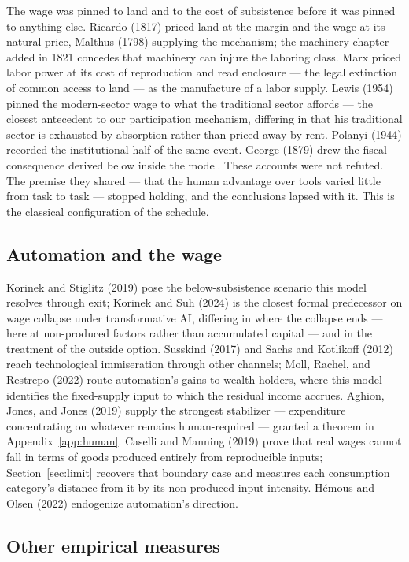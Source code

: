\documentclass[12pt]{article}
\theoremstyle{plain}
\begin{document}
The wage was pinned to land and to the cost of subsistence before it was pinned to anything else. Ricardo (1817) priced land at the margin and the wage at its natural price, Malthus (1798) supplying the mechanism; the machinery chapter added in 1821 concedes that machinery can injure the laboring class. Marx priced labor power at its cost of reproduction and read enclosure --- the legal extinction of common access to land --- as the manufacture of a labor supply. Lewis (1954) pinned the modern-sector wage to what the traditional sector affords --- the closest antecedent to our participation mechanism, differing in that his traditional sector is exhausted by absorption rather than priced away by rent. Polanyi (1944) recorded the institutional half of the same event. George (1879) drew the fiscal consequence derived below inside the model. These accounts were not refuted. The premise they shared --- that the human advantage over tools varied little from task to task --- stopped holding, and the conclusions lapsed with it. This is the classical configuration of the schedule.

\subsection{Automation and the wage}\label{sec:automation}

Korinek and Stiglitz (2019) pose the below-subsistence scenario this model resolves through exit; Korinek and Suh (2024) is the closest formal predecessor on wage collapse under transformative AI, differing in where the collapse ends --- here at non-produced factors rather than accumulated capital --- and in the treatment of the outside option. Susskind (2017) and Sachs and Kotlikoff (2012) reach technological immiseration through other channels; Moll, Rachel, and Restrepo (2022) route automation's gains to wealth-holders, where this model identifies the fixed-supply input to which the residual income accrues. Aghion, Jones, and Jones (2019) supply the strongest stabilizer --- expenditure concentrating on whatever remains human-required --- granted a theorem in Appendix~\ref{app:human}. Caselli and Manning (2019) prove that real wages cannot fall in terms of goods produced entirely from reproducible inputs; Section~\ref{sec:limit} recovers that boundary case and measures each consumption category's distance from it by its non-produced input intensity. Hémous and Olsen (2022) endogenize automation's direction.

\subsection{Other empirical measures}\label{sec:data}
\end{document}
